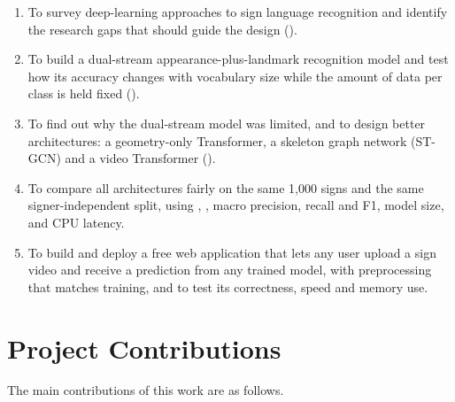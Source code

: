 \begin{enumerate}[label=\textbf{O\arabic*.}, leftmargin=2.6em]
  \item To survey deep-learning approaches to sign language recognition and
  identify the research gaps that should guide the design
  (\capA{}).
  \item To build a dual-stream appearance-plus-landmark recognition model
  and test how its accuracy changes with vocabulary size while the amount
  of data per class is held fixed (\capB{}).
  \item To find out why the dual-stream model was limited, and to design
  better architectures: a geometry-only Transformer, a skeleton graph
  network (ST-GCN) and a video Transformer (\swin{}).
  \item To compare all architectures fairly on the same 1,000 signs and
  the same signer-independent split, using \topone{}, \topfive{}, macro
  precision, recall and F1, model size, and CPU latency.
  \item To build and deploy a free web application that lets any user
  upload a sign video and receive a prediction from any trained model,
  with preprocessing that matches training, and to test its correctness,
  speed and memory use.
\end{enumerate}

\section{Project Contributions}
\label{sec:contributions}

The main contributions of this work are as follows.

